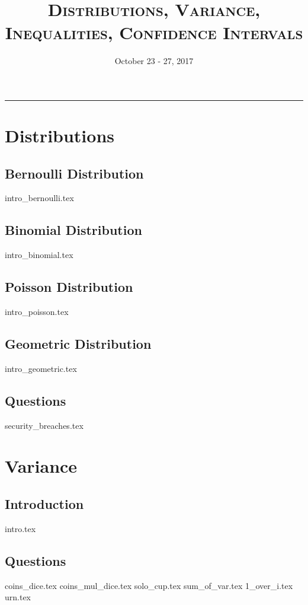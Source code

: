 \documentclass{exam}
\title{\textsc{Distributions, Variance, Inequalities, Confidence Intervals}}
\date{October 23 - 27, 2017}
\begin{document}
\maketitle
\rule{\textwidth}{0.15em}
\fontsize{12}{15}\selectfont
\thispagestyle{empty}

\section{Distributions}
\subsection{Bernoulli Distribution}
{intro_bernoulli.tex}
\subsection{Binomial Distribution}
{intro_binomial.tex}
\subsection{Poisson Distribution}
{intro_poisson.tex}
\subsection{Geometric Distribution}
{intro_geometric.tex}
\subsection{Questions}
\begin{questions}
{security_breaches.tex}
\end{questions}

\section{Variance}
\subsection{Introduction}
{intro.tex}
\subsection{Questions}
\begin{questions}
{coins_dice.tex}
{coins_mul_dice.tex}
{solo_cup.tex}
\clearpage
{sum_of_var.tex}
{1_over_i.tex}
{urn.tex}
\end{questions}
\end{document}
